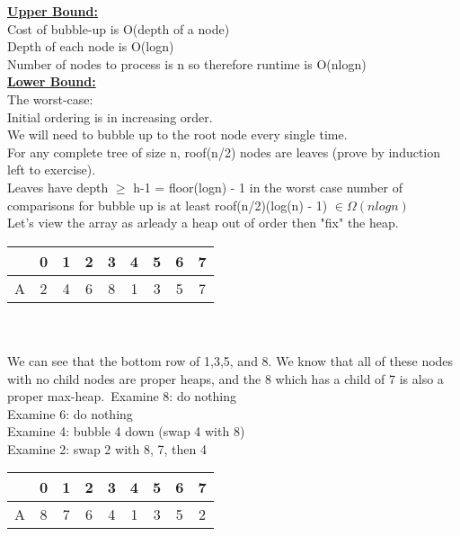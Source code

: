 \documentclass[12pt]{article}
\newcommand{\myt}[1]{\textbf{\underline{#1}}}
\begin{document}
	\myt{Upper Bound:}\\
	Cost of bubble-up is O(depth of a node)\\
	Depth of each node is O(logn)\\
	Number of nodes to process is n so therefore runtime is O(nlogn)\\
	
	\myt{Lower Bound:}\\
	The worst-case:\\
	Initial ordering is in increasing order.\\
	We will need to bubble up to the root node every single time.\\
	
	For any complete tree of size n, roof(n/2) nodes are leaves (prove by induction left to exercise).\\
	Leaves have depth $\geq$ h-1 = floor(logn) - 1 in the worst case number of comparisons for bubble up is at least roof(n/2)(log(n) - 1) $\in \Omega(nlogn)$\\
	
	Let's view the array as arleady a heap out of order then "fix" the heap.\\
	
	\begin{tabular}{c | c | c | c | c | c | c | c | c }
		& 0 & 1 & 2 & 3 & 4 & 5 & 6 & 7 \\ \hline
		A & 2 & 4 & 6 & 8 & 1 & 3 & 5 & 7 \\
	\end{tabular}\\\\
	
	We can see that the bottom row of 1,3,5, and 8. We know that all of these nodes with no child nodes are proper heaps, and the 8 which has a child of 7 is also a proper max-heap.\
	Examine 8: do nothing\\
	Examine 6: do nothing\\
	Examine 4: bubble 4 down (swap 4 with 8)\\
	Examine 2: swap 2 with 8, 7, then 4
	
	\begin{tabular}{c | c | c | c | c | c | c | c | c }
		& 0 & 1 & 2 & 3 & 4 & 5 & 6 & 7 \\ \hline
		A & 8 & 7 & 6 & 4 & 1 & 3 & 5 & 2 \\
	\end{tabular}\\\\
	
\end{document}

